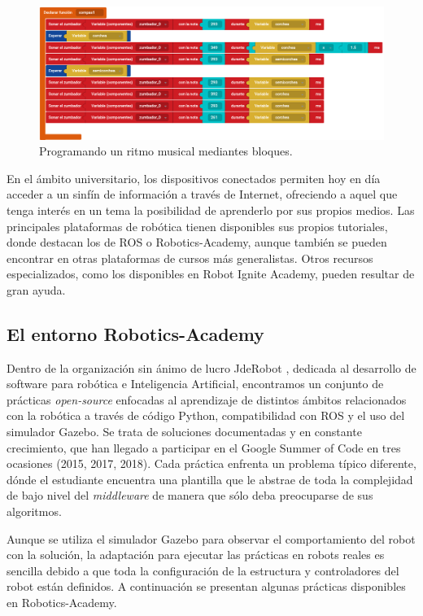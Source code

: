 \documentclass[12pt,spanish,chapterprefix, numbers=noenddot]{book}
\numberwithin{equation}{section}
\numberwithin{figure}{section}
\begin{document}
    \begin{figure}[h!]
    \centering
    \includegraphics[width=14cm]{Figs/compas_bitbloq.png}
    \par
    \caption{\label{fig:bitbloq}Programando un ritmo musical mediantes bloques.}
    \end{figure}

En el ámbito universitario, los dispositivos conectados permiten hoy en día acceder a un sinfín de información a través de Internet, ofreciendo a aquel que tenga interés en un tema la posibilidad de aprenderlo por sus propios medios. 
Las principales plataformas de robótica tienen disponibles sus propios tutoriales, donde destacan los de ROS o Robotics-Academy, aunque también se pueden encontrar en otras plataformas de cursos más generalistas. Otros recursos especializados, como los disponibles en Robot Ignite Academy, pueden resultar de gran ayuda. 

\subsection{El entorno Robotics-Academy}
Dentro de la organización sin ánimo de lucro JdeRobot \cite{jderobot}, dedicada al desarrollo de software para robótica e Inteligencia Artificial, encontramos un conjunto de prácticas \textit{open-source} enfocadas al aprendizaje de distintos ámbitos relacionados con la robótica a través de código Python, compatibilidad con ROS y el uso del simulador Gazebo. Se trata de soluciones documentadas y en constante crecimiento, que han llegado a participar en el Google Summer of Code en tres ocasiones (2015, 2017, 2018).
Cada práctica enfrenta un problema típico diferente, dónde el estudiante encuentra una plantilla que le abstrae de toda la complejidad de bajo nivel del \textit{middleware} de manera que sólo deba preocuparse de sus algoritmos. 

Aunque se utiliza el simulador Gazebo para observar el comportamiento del robot con la solución, la adaptación para ejecutar las prácticas en robots reales es sencilla debido a que toda la configuración de la estructura y controladores del robot están definidos. A continuación se presentan algunas prácticas disponibles en Robotics-Academy.
\end{document}
